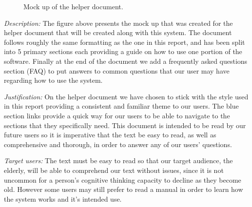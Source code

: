 \begin{figure}[H]
\centering


\caption{Mock up of the helper document.}
\label{fig:help}
\end{figure}

\textit{Description:} The figure above presents the mock up
that was created for the helper document that will be
created along with this system. The document follows roughly
the same formatting as the one in this report, and has been
split into 5 primary sections each providing a guide on how
to use one portion of the software. Finally at the end of
the document we add a frequently asked questions section
(FAQ) to put answers to common questions that our user may
have regarding how to use the system.
\\ \vspace{0.2cm}

\textit{Justification:}
On the helper document we have chosen to stick with the
style used in this report providing a consistent and
familiar theme to our users. The blue section links
provide a quick way for our users to be able to navigate
to the sections that they specifically need. This document is
intended to be read by our future users so it is imperative
that the text be easy to read, as well as comprehensive and
thorough, in order to answer any of our users' questions. \\ \vspace{0.2cm}

\textit{Target users:}
The text must be easy to read so that our target
audience, the elderly, will be able to comprehend our text
without issues, since it is not uncommon for a person's
cognitive thinking capacity to decline as they become old.
However some users may still prefer to read a manual in
order to learn how the system works and it's intended use.
\\ \vspace{0.2cm}

